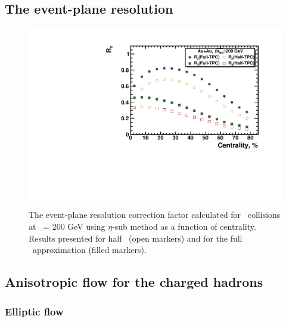 \FloatBarrier
\subsection{The event-plane resolution}

\begin{figure}[ht]
    \centering
    \includegraphics[width=0.7\linewidth]{Figures/ResEPFullHalfvn.pdf}
    \caption{The event-plane resolution correction factor calculated for \AuAu\ collisions at \sNN\ = 200 GeV using $\eta$-sub method as a function of centrality. Results presented for half \TPC\ (open markers) and for the full \TPC\ approximation \cite{Ollitrault:1992bk,Ollitrault:1993ba} (filled markers).}
    \label{fig:res_EP}
\end{figure}

\FloatBarrier
\subsection{Anisotropic flow for the charged hadrons}

\FloatBarrier
\subsubsection{Elliptic flow}

